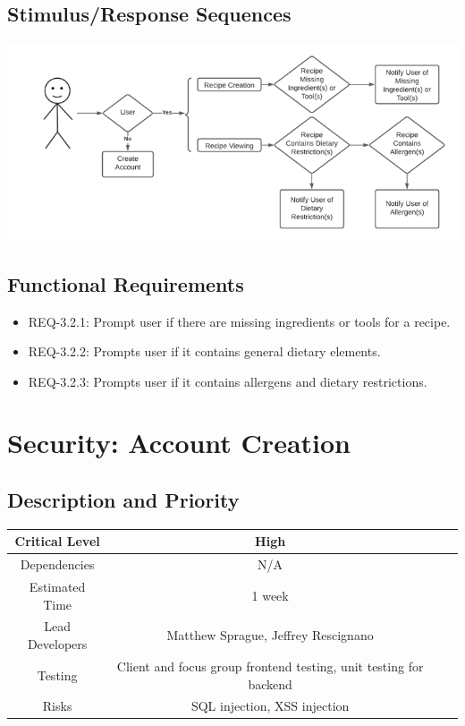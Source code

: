 \documentclass{scrreprt}
\begin{document}
\subsection{Stimulus/Response Sequences}

\includegraphics{FlowCharts/Search-Flags.png}

\subsection{Functional Requirements}

\begin{itemize}
    \item REQ-3.2.1: Prompt user if there are missing ingredients or tools for a recipe.
    \item REQ-3.2.2: Prompts user if it contains general dietary elements.
    \item REQ-3.2.3: Prompts user if it contains allergens and dietary restrictions.    
\end{itemize}

\section{Security: Account Creation}

\subsection{Description and Priority}
\begin{center}
    \begin{tabular}{| c | c | c | c |}
        \hline
        Critical Level & High \\
        \hline
        Dependencies & N/A \\
        \hline
        Estimated Time & 1 week \\
        \hline
        Lead Developers & Matthew Sprague, Jeffrey Rescignano \\
        \hline
        Testing & Client and focus group frontend testing, unit testing for backend \\
        \hline
        Risks & SQL injection, XSS injection \\
        \hline
    \end{tabular}
\end{center}
\end{document}
